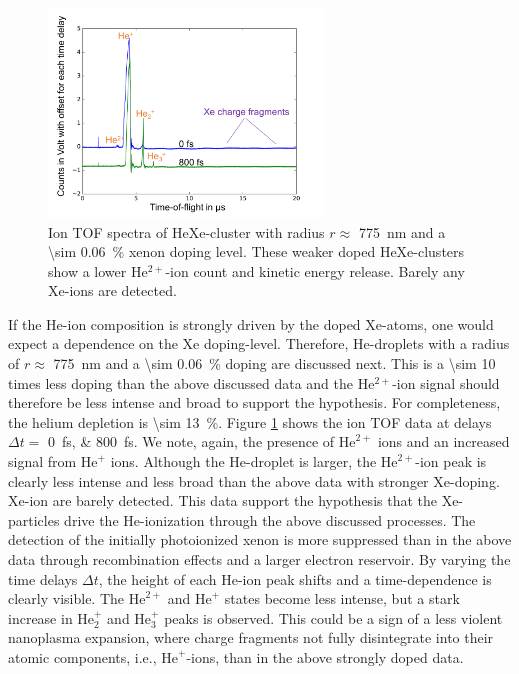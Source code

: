 %
\begin{figure}
 	\centering
 		\includegraphics[width=0.65\textwidth]{images/results/TOF-helium-xenon-cluster-13-2.png}
 	\caption[TOF spectra of HeXe-clusters with \SI{\sim 0.06}{\percent} Xe-doping at various delays.]{Ion TOF spectra of HeXe-cluster with radius $r\approx$ \SI{775}{\nano\meter} and a \SI{\sim 0.06}{\percent} xenon doping level. These weaker doped HeXe-clusters show a lower He$^{2+}$-ion count and kinetic energy release. Barely any Xe-ions are detected.}
 	\label{fig:TOF-helium-xenon-cluster-13}
\end{figure}
%
If the He-ion composition is strongly driven by the doped Xe-atoms, one would expect a dependence on the Xe doping-level. Therefore, He-droplets with a radius of $r\approx$ \SI{775}{\nano\meter} and a \SI{\sim 0.06}{\percent} doping are discussed next. This is a \num{\sim 10} times less doping than the above discussed data and the He$^{2+}$-ion signal should therefore be less intense and broad to support the hypothesis. For completeness, the helium depletion is \SI{\sim 13}{\percent}. Figure \ref{fig:TOF-helium-xenon-cluster-13} shows the ion TOF data at delays $\Delta t=$ \SIlist{0;800}{\femto\second}. We note, again, the presence of $\text{He}^{2+}$ ions and an increased signal from $\text{He}^{+}$ ions. Although the He-droplet is larger, the $\text{He}^{2+}$-ion peak is clearly less intense and less broad than the above data with stronger Xe-doping. Xe-ion are barely detected. This data support the hypothesis that the Xe-particles drive the He-ionization through the above discussed processes. The detection of the initially photoionized xenon is more suppressed than in the above data through recombination effects and a larger electron reservoir. By varying the time delays $\Delta t$, the height of each He-ion peak shifts and a time-dependence is clearly visible. The $\text{He}^{2+}$ and $\text{He}^{+}$ states become less intense, but a stark increase in $\text{He}_{2}^{+}$ and $\text{He}_{3}^{+}$ peaks is observed. This could be a sign of a less violent nanoplasma expansion, where charge fragments not fully disintegrate into their atomic components, i.e., $\text{He}^{+}$-ions, than in the above strongly doped data.\\[1\baselineskip]
